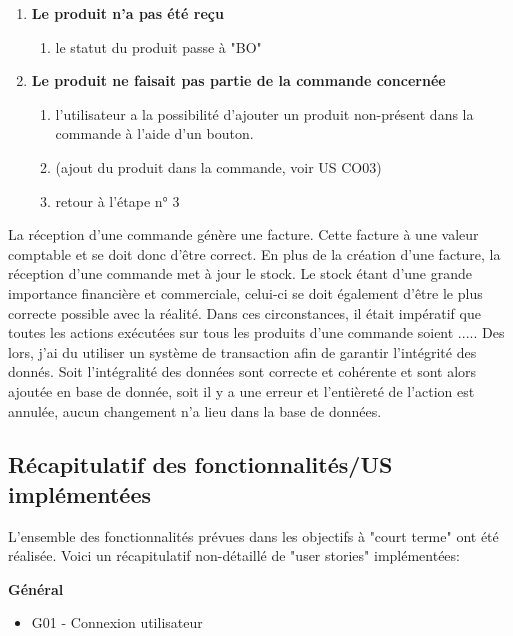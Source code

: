 \begin{enumerate}
  \newpara
  \item \textbf{Le produit n'a pas été reçu}
  \begin{enumerate}
    \item le statut du produit passe à "BO"
  \end{enumerate}

  \newpara
  \item \textbf{Le produit ne faisait pas partie de la commande concernée}
  \begin{enumerate}
    \item l'utilisateur a la possibilité d'ajouter un produit non-présent dans la commande à l'aide d'un bouton.
    \item (ajout du produit dans la commande, voir US CO03)
    \item retour à l'étape n° 3
  \end{enumerate}

\end{enumerate}

\newpara

La réception d'une commande génère une facture. Cette facture à une valeur comptable et se doit donc d'être correct. En plus de la création d'une facture, la réception d'une commande met à jour le stock. Le stock étant d'une grande importance financière et commerciale, celui-ci se doit également d'être le plus correcte possible avec la réalité. Dans ces circonstances, il était impératif que toutes les actions exécutées sur tous les produits d'une commande soient ..... Des lors, j'ai du utiliser un système de transaction afin de garantir l'intégrité des donnés. Soit l'intégralité des données sont correcte et cohérente et sont alors ajoutée en base de donnée, soit il y a une erreur et l'entièreté de l'action est annulée, aucun changement n'a lieu dans la base de données. 

\newpage

\subsection{Récapitulatif des fonctionnalités/US implémentées}
L'ensemble des fonctionnalités prévues dans les objectifs à "court terme" ont été réalisée. Voici un récapitulatif non-détaillé de "user stories" implémentées:  

\newpara
\textbf{Général}
\begin{itemize}
  \item \checkmark G01 - Connexion utilisateur
\end{itemize}


